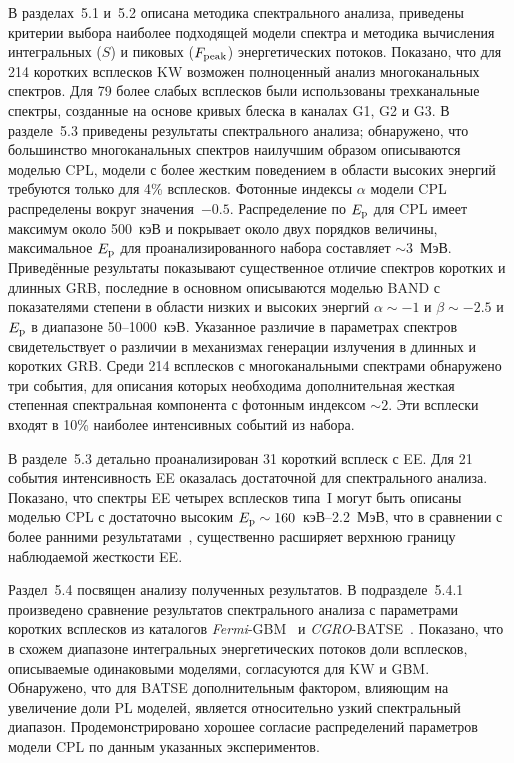 В разделах~5.1 и~5.2 описана методика спектрального анализа, приведены критерии 
выбора наиболее подходящей модели спектра
и методика вычисления интегральных ($S$) и пиковых ($F_{\mathrm{peak}}$) энергетических потоков. 
Показано, что для 214 коротких всплесков KW возможен полноценный анализ многоканальных спектров. 
Для 79 более слабых всплесков были использованы трехканальные спектры, 
созданные на основе кривых блеска в каналах G1, G2 и G3. 
В разделе~5.3 приведены результаты спектрального анализа; обнаружено, 
что большинство многоканальных спектров наилучшим образом описываются моделью CPL,
модели с более жестким поведением в области высоких энергий требуются только для 4\% всплесков. 
Фотонные индексы $\alpha$ модели CPL распределены 
вокруг значения~$-0.5$. Распределение по $E_{\mathrm{p}}$ для CPL имеет максимум около 500~кэВ 
и покрывает около двух порядков величины, максимальное $E_{\mathrm{p}}$ для 
проанализированного набора составляет $\sim 3$~МэВ. 
Приведённые результаты показывают существенное отличие спектров коротких и длинных GRB, 
последние в основном описываются моделью BAND с показателями степени в области низких 
и высоких энергий $\alpha \sim -1$ и $\beta \sim -2.5$ и $E_{\mathrm{p}}$ в диапазоне 50--1000~кэВ.
Указанное различие в параметрах спектров свидетельствует о различии в механизмах 
генерации излучения в длинных и коротких GRB.
Среди 214 всплесков с многоканальными спектрами обнаружено три события, 
для описания которых необходима дополнительная жесткая степенная 
спектральная компонента с фотонным индексом $\sim 2$. 
Эти всплески входят в 10\% наиболее интенсивных событий из набора.

В разделе~5.3 детально проанализирован 31 короткий всплеск с EE.
Для 21 события интенсивность EE оказалась достаточной 
для спектрального анализа. Показано, что спектры EE четырех всплесков типа~I могут 
быть описаны моделью CPL с достаточно высоким $E_{\mathrm{p}} \sim 160$~кэВ--2.2~МэВ,
что в сравнении с более ранними результатами~\citep{Bostanci_2013MNRAS,Kaneko_2015MNRAS}, 
существенно расширяет верхнюю границу наблюдаемой жесткости EE.  

Раздел~5.4 посвящен анализу полученных результатов.
В подразделе~5.4.1 произведено сравнение результатов спектрального анализа 
с параметрами коротких всплесков из каталогов \textit{Fermi}-GBM~\citep{Gruber_2014ApJS} 
и \textit{CGRO}-BATSE~\citep{Goldstein_2013ApJS}. 
Показано, что в схожем диапазоне интегральных энергетических потоков доли всплесков, 
описываемые одинаковыми моделями, согласуются для KW и GBM. Обнаружено, что для BATSE 
дополнительным фактором, влияющим на увеличение доли PL моделей, 
является относительно узкий спектральный диапазон.
Продемонстрировано хорошее согласие распределений параметров модели CPL 
по данным указанных экспериментов. 

